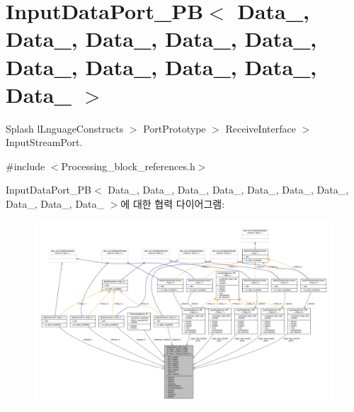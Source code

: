 \hypertarget{classInputDataPort__PB}{}\section{Input\+Data\+Port\+\_\+\+PB$<$ Data\+\_, Data\+\_, Data\+\_, Data\+\_, Data\+\_, Data\+\_, Data\+\_, Data\+\_, Data\+\_, Data\+\_ $>$}
\label{classInputDataPort__PB}


Splash l\+Lnguage\+Constructs $>$ Port\+Prototype $>$ Receive\+Interface $>$ Input\+Stream\+Port.  




{\ttfamily \#include $<$Processing\+\_\+block\+\_\+references.\+h$>$}



Input\+Data\+Port\+\_\+\+PB$<$ Data\+\_, Data\+\_, Data\+\_, Data\+\_, Data\+\_, Data\+\_, Data\+\_, Data\+\_, Data\+\_, Data\+\_ $>$에 대한 협력 다이어그램\+:\nopagebreak
\begin{figure}[H]
\begin{center}
\leavevmode
\includegraphics[width=350pt]{classInputDataPort__PB__coll__graph}
\end{center}
\end{figure}
